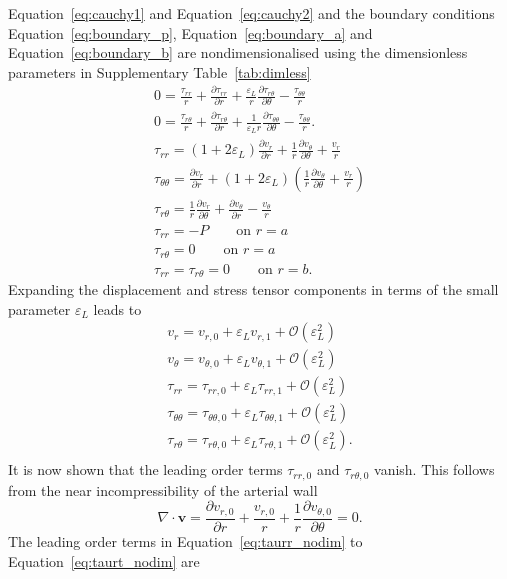 \documentclass{frontiers_suppmat} %
\newcommand{\beq}{\begin{equation}}
\newcommand{\eeq}{\end{equation}}
\newcommand{\dd}{\partial}
\newcommand{\vareps}{\varepsilon}
\newcommand{\disp}{\boldsymbol{v}}
\newcommand{\taurr}{\tau_{rr}}
\newcommand{\taurt}{\tau_{r\theta}}
\newcommand{\tautt}{\tau_{\theta\theta}}
\newcommand{\taurrl}{\tau_{rr,0}}
\newcommand{\taurtl}{\tau_{r\theta,0}}
\newcommand{\tauttl}{\tau_{\theta\theta,0}}
\newcommand{\taurre}{\tau_{rr,1}}
\newcommand{\taurte}{\tau_{r\theta,1}}
\newcommand{\tautte}{\tau_{\theta\theta,1}}
\begin{document}
Equation~\ref{eq:cauchy1} and Equation~\ref{eq:cauchy2} and the boundary conditions Equation~\ref{eq:boundary_p}, Equation~\ref{eq:boundary_a} and Equation~\ref{eq:boundary_b} are nondimensionalised using the dimensionless parameters in Supplementary Table~\ref{tab:dimless}
\begin{gather}
0 = \frac{\taurr}{r} + \frac{\dd \taurr}{\dd r} + \frac{\vareps_L}{r} \frac{\dd \taurt}{\dd \theta} - \frac{\tautt}{r}\label{eq:cauchy1_nodim}\\
0 = \frac{\taurt}{r} + \frac{\dd \taurt}{\dd r} + \frac{1}{\vareps_L r} \frac{\dd \tautt}{\dd \theta} - \frac{\tautt}{r}.\label{eq:cauchy2_nodim}\\
\taurr = (1 + 2\vareps_L) \frac{\dd v_r}{\dd r} + \frac{1}{r} \frac{\dd v_{\theta}}{\dd \theta} + \frac{v_r}{r}\label{eq:taurr_nodim}\\
\tautt = \frac{\dd v_r}{\dd r} + (1 + 2\vareps_L) \left( \frac{1}{r} \frac{\dd v_{\theta}}{\dd \theta} + \frac{v_r}{r} \right)\\
\taurt = \frac{1}{r} \frac{\dd v_r}{\dd \theta} + \frac{\dd v_{\theta}}{\dd r} - \frac{v_{\theta}}{r}\label{eq:taurt_nodim}\\
\taurr = -P \qquad \text{on } r = a\\
\taurt = 0 \qquad \text{on } r = a\\
\taurr = \taurt = 0 \qquad \text{on } r = b.
\end{gather}
Expanding the displacement and stress tensor components in terms of the small parameter $\vareps_L$ leads to
\begin{gather*}
v_r = v_{r,0} + \vareps_L v_{r,1} + \mathcal{O}(\vareps_L^2)\\
v_{\theta} = v_{\theta,0} + \vareps_L v_{\theta,1} + \mathcal{O}(\vareps_L^2)\\
\taurr = \taurrl + \vareps_L \taurre + \mathcal{O}(\vareps_L^2)\\
\tautt = \tauttl + \vareps_L \tautte + \mathcal{O}(\vareps_L^2)\\
\taurt = \taurtl + \vareps_L \taurte + \mathcal{O}(\vareps_L^2).\\
\end{gather*}
It is now shown that the leading order terms $\taurrl$ and $\taurtl$ vanish. This follows from the near incompressibility of the arterial wall
\beq
\nabla \cdot \disp = \frac{\dd v_{r,0}}{\dd r} + \frac{v_{r,0}}{r} + \frac{1}{r} \frac{\dd v_{\theta,0}}{\dd \theta} = 0.\label{eq:wall_incompressible}
\eeq
The leading order terms in Equation~\ref{eq:taurr_nodim} to Equation~\ref{eq:taurt_nodim} are\\
\end{document}
